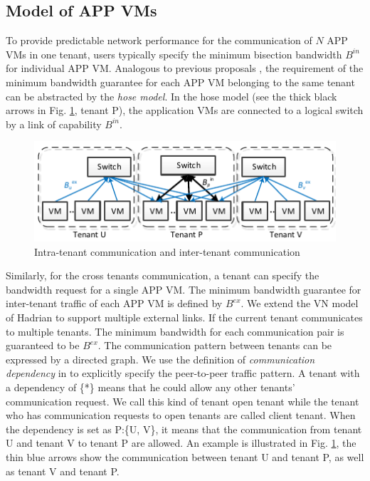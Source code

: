 \documentclass[10pt, conference, letterpaper]{IEEEtran}
\begin{document}
\subsection{Model of APP VMs}
To provide predictable network performance for the communication of $N$ APP VMs in one tenant, users typically specify the minimum bisection bandwidth $B^{in}$ for individual APP VM. Analogous to previous proposals \cite{B13cta, P12fst}, the requirement of the minimum bandwidth guarantee for each APP VM belonging to the same tenant can be abstracted by the \emph{hose model}. In the hose model (see the thick black arrows in Fig. \ref{fig:hose}, tenant P), the application VMs are connected to a logical switch by a link of capability $B^{in}$.

\begin{figure}
	\centering
		\includegraphics[width=3.5 in]{fig/tagmodel.pdf}
	\caption{Intra-tenant communication and inter-tenant communication}
	\label{fig:hose}
\end{figure}

Similarly, for the cross tenants communication, a tenant can specify the bandwidth request for a single APP VM. The minimum bandwidth guarantee for inter-tenant traffic of each APP VM is defined by $B^{ex}$. We extend the VN model of Hadrian \cite{B13cta} to support multiple external links. If the current tenant communicates to multiple tenants. The minimum bandwidth for each communication pair is guaranteed to be $B^{ex}$. The communication pattern between tenants can be expressed by a directed graph. We use the definition of \emph{communication dependency} in \cite{B13cta} to explicitly specify the peer-to-peer traffic pattern. A tenant with a dependency of \{*\} means that he could allow any other tenants' communication request. We call this kind of tenant open tenant while the tenant who has communication requests to open tenants are called client tenant. When the dependency is set as P:\{U, V\}, it means that the communication from tenant U and tenant V to tenant P are allowed. An example is illustrated in Fig. \ref{fig:hose}, the thin blue arrows show the communication between tenant U and tenant P, as well as tenant V and tenant P.
\end{document}
